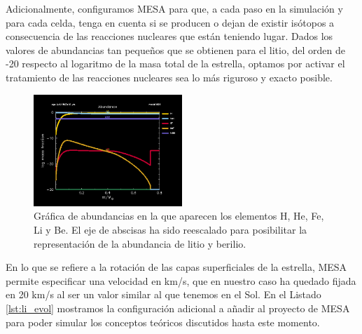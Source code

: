Adicionalmente, configuramos MESA para que, a cada paso en la simulación y para cada celda, tenga en cuenta si se producen o dejan de existir isótopos a consecuencia de las reacciones nucleares que están teniendo lugar. Dados los valores de abundancias tan pequeños que se obtienen para el litio, del orden de -20 respecto al logaritmo de la masa total de la estrella, optamos por activar el tratamiento de las reacciones nucleares sea lo más riguroso y exacto posible.\par

\begin{figure}
	\centering
	\includegraphics[width=0.5\textwidth]{img/tesis/abundances.pdf}
	\caption {Gráfica de abundancias en la que aparecen los elementos H, He, Fe, Li y Be. El eje de abscisas ha sido reescalado para posibilitar la representación de la abundancia de litio y berilio.}
	\label{fig:abundances}
\end{figure}


En lo que se refiere a la rotación de las capas superficiales de la estrella, MESA permite especificar una velocidad en km/s, que en nuestro caso ha quedado fijada en 20 km/s al ser un valor similar al que tenemos en el Sol. En el Listado \ref{lst:li_evol} mostramos la configuración adicional a añadir al proyecto de MESA para poder simular los conceptos teóricos discutidos hasta este momento.

